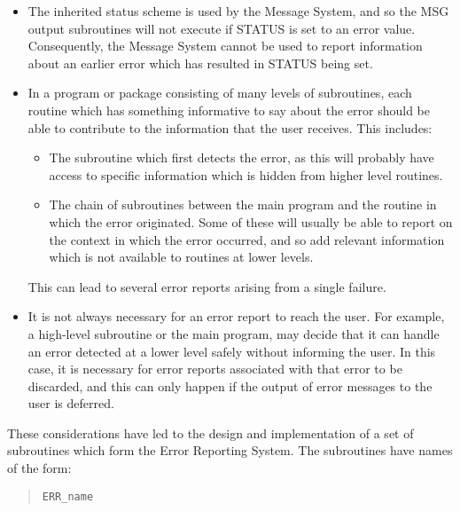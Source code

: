 \documentclass[twoside,11pt]{article}
\renewcommand{\_}{\texttt{\symbol{95}}}
\begin{document}
\begin {itemize}
\item The inherited status scheme is used by the Message System, and so the 
MSG output subroutines will not execute if STATUS is set to an error value. 
Consequently, the Message System cannot be used to report information about
an earlier error which has resulted in STATUS being set. 

\item In a program or package consisting of many levels of subroutines, each
routine which has something informative to say about the error should be
able to contribute to the information that the user receives.
This includes:

\begin {itemize}
\item The subroutine which first detects the error, as this will probably
have access to specific information which is hidden from higher level
routines. 

\item The chain of subroutines between the main program and the routine in
which the error originated.
Some of these will usually be able to report on the context in which the error
occurred, and so add relevant information which is not available to routines 
at lower levels. 
\end {itemize}

This can lead to several error reports arising from a single failure. 

\item It is not always necessary for an error report to reach the user. 
For example, a high-level subroutine or the main program, may decide that it
can handle an error detected at a lower level safely without informing the
user. 
In this case, it is necessary for error reports associated with that
error to be discarded, and this can only happen if the output of error
messages to the user is deferred. 

\end {itemize}

These considerations have led to the design and implementation of a set of
subroutines which form the Error Reporting System.
The subroutines have names of the form:

\begin {quote}
\begin {small}
\begin{verbatim}
ERR_name
\end{verbatim}
\end {small}
\end {quote}
\end{document}
